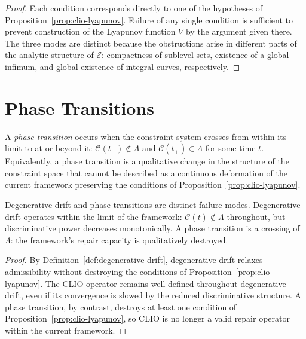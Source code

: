 \documentclass[11pt,openany]{book}
\begin{document}
\begin{proof}
Each condition corresponds directly to one of the
hypotheses of Proposition~\ref{prop:clio-lyapunov}.
Failure of any single condition is sufficient to prevent
construction of the Lyapunov function $V$ by the argument
given there.  The three modes are distinct because the
obstructions arise in different parts of the analytic
structure of $\mathcal{E}$: compactness of sublevel sets,
existence of a global infimum, and global existence of
integral curves, respectively.
\end{proof}

\section{Phase Transitions}
\label{sec:phase-transitions}

\begin{definition}
\label{def:phase-transition}
A \emph{phase transition} occurs when the constraint
system crosses from within its limit to at or beyond it:
$\mathcal{C}(t_-) \notin \Lambda$ and $\mathcal{C}(t_+)
\in \Lambda$ for some time $t$.  Equivalently, a phase
transition is a qualitative change in the structure of the
constraint space that cannot be described as a continuous
deformation of the current framework preserving the
conditions of Proposition~\ref{prop:clio-lyapunov}.
\end{definition}

\begin{proposition}
\label{prop:phase-vs-drift}
Degenerative drift and phase transitions are distinct
failure modes.  Degenerative drift operates within the
limit of the framework: $\mathcal{C}(t) \notin \Lambda$
throughout, but discriminative power decreases
monotonically.  A phase transition is a crossing of
$\Lambda$: the framework's repair capacity is
qualitatively destroyed.
\end{proposition}

\begin{proof}
By Definition~\ref{def:degenerative-drift}, degenerative
drift relaxes admissibility without destroying the
conditions of Proposition~\ref{prop:clio-lyapunov}.  The
CLIO operator remains well-defined throughout degenerative
drift, even if its convergence is slowed by the reduced
discriminative structure.  A phase transition, by contrast,
destroys at least one condition of
Proposition~\ref{prop:clio-lyapunov}, so CLIO is no longer
a valid repair operator within the current framework.
\end{proof}
\end{document}
